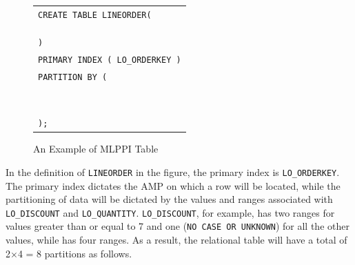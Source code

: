 \documentclass[runningheads]{comsis2}
\begin{document}
\begin{figure}[t]
\begin{center}
{\small
\begin{tabular}{l}
{\tt CREATE TABLE LINEORDER(} \\
\hspace{0.1in}{\tt LO\_ORDERKEY INTEGER,} \\
\hspace{0.1in}{\tt LO\_QUANTITY INTEGER,} \\
\hspace{0.1in}{\tt LO\_DISCOUNT INTEGER} \\
{\tt )} \\
{\tt PRIMARY INDEX ( LO\_ORDERKEY )} \\
{\tt PARTITION BY (} \\
\hspace{0.1in}{\tt CASE\_N(} \\
\hspace{0.2in}{\tt LO\_DISCOUNT >= 7,} \\
\hspace{0.2in}{\tt NO CASE OR UNKNOWN),} \\
\hspace{0.1in}{\tt CASE\_N(}\\
\hspace{0.2in}{\tt LO\_QUANTITY < 25,} \\
\hspace{0.2in}{\tt LO\_QUANTITY >= 25 AND LO\_QUANTITY <= 30,} \\
\hspace{0.2in}{\tt LO\_QUANTITY > 30 AND LO\_QUANTITY <= 35,} \\
\hspace{0.2in}{\tt NO CASE OR UNKNOWN)} \\
{\tt );} \\
\end{tabular}
}
\end{center}
\vspace{-0.2in}
\caption{An Example of MLPPI Table\label{fig:exam}}
\end{figure}

In the definition of {\tt LINEORDER} in the figure, the primary index 
is {\tt LO\_ORDERKEY}. 
The \hbox{primary} index \hbox{dictates} the AMP on which a row will be located, 
while the partitioning of data will be dictated by the values and 
ranges associated with {\tt LO\_DISCOUNT} and {\tt LO\_QUANTITY}. 
{\tt LO\_DISCOUNT}, for example, has two ranges for \hbox{values} 
greater than or equal to 7 and one ({\tt NO CASE OR UNKNOWN}) 
for all the other values, while  has four ranges. 
As a result, the relational table will have a total of 2$\times$4 = 8 partitions as follows.
\end{document}
